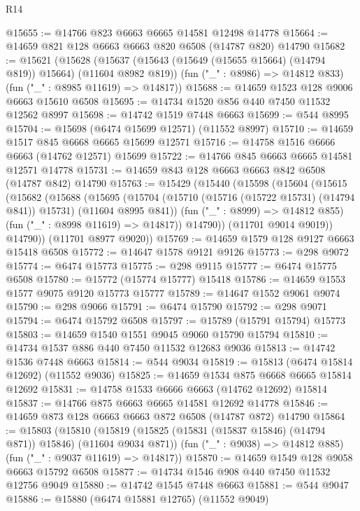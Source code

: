 \begin{lexlean}{R14}
\begin{coremodule}
{{{{{{{{{{{{{{{{{{{{{{{{{{{{{{{{{{{{{{{{{{{{{{{{{{{{{{{{{{{{{{{{{{{{{{{{{{{{{{{{{{@15655 := @14766 @823 @6663 @6665 @14581 @12498 @14778
@15664 := @14659 @821 @128 @6663 @6663 @820 @6508 (@14787 @820) @14790
@15682 := @15621
    (@15628
      (@15637 (@15643 (@15649 (@15655 @15664) (@14794 @819)) @15664) (@11604 @8982 @819))
      (fun ("_" : @8986) => @14812 @833)
      (fun ("_" : @8985 @11619) => @14817))
@15688 := @14659 @1523 @128 @9006 @6663 @15610 @6508
@15695 := @14734 @1520 @856 @440 @7450 @11532 @12562 @8997
@15698 := @14742 @1519 @7448 @6663
@15699 := @544 @8995
@15704 := @15698 (@6474 @15699 @12571) (@11552 @8997)
@15710 := @14659 @1517 @845 @6668 @6665 @15699 @12571
@15716 := @14758 @1516 @6666 @6663 (@14762 @12571) @15699
@15722 := @14766 @845 @6663 @6665 @14581 @12571 @14778
@15731 := @14659 @843 @128 @6663 @6663 @842 @6508 (@14787 @842) @14790
@15763 := @15429
    (@15440
      (@15598
        (@15604
          (@15615
            (@15682
              (@15688
                (@15695
                  (@15704
                    (@15710 (@15716 (@15722 @15731) (@14794 @841)) @15731)
                    (@11604 @8995 @841))
                  (fun ("_" : @8999) => @14812 @855)
                  (fun ("_" : @8998 @11619) => @14817))
                @14790))
            (@11701 @9014 @9019))
          @14790))
      (@11701 @8977 @9020))
@15769 := @14659 @1579 @128 @9127 @6663 @15418 @6508
@15772 := @14647 @1578 @9121 @9126
@15773 := @298 @9072
@15774 := @6474 @15773
@15775 := @298 @9115
@15777 := @6474 @15775 @6508
@15780 := @15772 (@15774 @15777) @15418
@15786 := @14659 @1553 @1577 @9075 @9120 @15773 @15777
@15789 := @14647 @1552 @9061 @9074
@15790 := @298 @9066
@15791 := @6474 @15790
@15792 := @298 @9071
@15794 := @6474 @15792 @6508
@15797 := @15789 (@15791 @15794) @15773
@15803 := @14659 @1540 @1551 @9045 @9060 @15790 @15794
@15810 := @14734 @1537 @886 @440 @7450 @11532 @12683 @9036
@15813 := @14742 @1536 @7448 @6663
@15814 := @544 @9034
@15819 := @15813 (@6474 @15814 @12692) (@11552 @9036)
@15825 := @14659 @1534 @875 @6668 @6665 @15814 @12692
@15831 := @14758 @1533 @6666 @6663 (@14762 @12692) @15814
@15837 := @14766 @875 @6663 @6665 @14581 @12692 @14778
@15846 := @14659 @873 @128 @6663 @6663 @872 @6508 (@14787 @872) @14790
@15864 := @15803
    (@15810
      (@15819 (@15825 (@15831 (@15837 @15846) (@14794 @871)) @15846) (@11604 @9034 @871))
      (fun ("_" : @9038) => @14812 @885)
      (fun ("_" : @9037 @11619) => @14817))
@15870 := @14659 @1549 @128 @9058 @6663 @15792 @6508
@15877 := @14734 @1546 @908 @440 @7450 @11532 @12756 @9049
@15880 := @14742 @1545 @7448 @6663
@15881 := @544 @9047
@15886 := @15880 (@6474 @15881 @12765) (@11552 @9049)
}}}}}}}}}}}}}}}}}}}}}}}}}}}}}}}}}}}}}}}}}}}}}}}}}}}}}}}}}}}}}}}}}}}}}}}}}}}}}}}}}}
\end{coremodule}
\end{lexlean}
